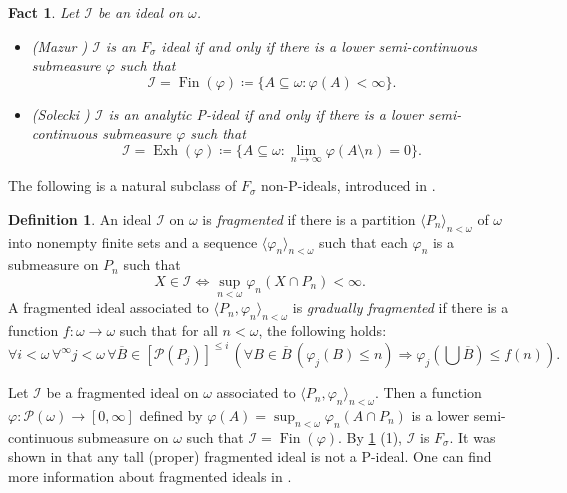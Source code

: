 \documentclass[a4paper,12pt]{amsart}
\newtheorem{fac}[thm]{Fact}
\theoremstyle{definition}
\newtheorem{dfn}[thm]{Definition}
\numberwithin{thm}{section}
\numberwithin{equation}{section}
\newcommand{\I}{\mathscr{I}}
\DeclareMathOperator{\Exh}{Exh}
\DeclareMathOperator{\Fin}{Fin}
\begin{document}
    \begin{fac}\label{fac:submeasure_chara}
        Let $\I$ be an ideal on $\omega$.
        \begin{itemize}
            \item \textnormal{(Mazur \cite{Maz91})} $\I$ is an $F_\sigma$ ideal if and only if there is a lower semi-continuous submeasure $\varphi$ such that
            \[
            \I=\Fin(\varphi)\coloneqq\{A\subseteq\omega:\varphi(A)<\infty\}.
            \]
            \item \textnormal{(Solecki \cite{Sol99})} $\I$ is an analytic P-ideal if and only if there is a lower semi-continuous submeasure $\varphi$ such that
            \[
            \I=\Exh(\varphi)\coloneqq\{A\subseteq\omega:\lim_{n\to\infty}\varphi(A\setminus n)=0\}.
            \]
        \end{itemize}
    \end{fac}
    
    The following is a natural subclass of $F_\sigma$ non-P-ideals, introduced in \cite{HRRZ14}.
    
    \begin{dfn}
        An ideal $\I$ on $\omega$ is \emph{fragmented} if there is a partition $\langle P_n\rangle_{n<\omega}$ of $\omega$ into nonempty finite sets and a sequence $\langle\varphi_n\rangle_{n<\omega}$ such that each $\varphi_n$ is a submeasure on $P_n$ such that
        \[
        X\in\I \iff \sup_{n<\omega}\varphi_n(X\cap P_n) < \infty.
        \]
        A fragmented ideal associated to $\langle P_n, \varphi_n\rangle_{n<\omega}$ is \emph{gradually fragmented} if there is a function $f\colon\omega\to\omega$ such that for all $n<\omega$, the following holds:
        \[
        \forall i<\omega\,\forall^{\infty} j<\omega\,\forall \overline{B}\in[\mathcal{P}(P_j)]^{\leq i}\,\left(\forall B\in\overline{B}\,(\varphi_j(B)\leq n)\Rightarrow\varphi_j\left(\bigcup\overline{B}\right)\leq f(n)\right).
        \]
    \end{dfn}

    Let $\I$ be a fragmented ideal on $\omega$ associated to $\langle P_n, \varphi_n\rangle_{n<\omega}$. Then a function $\varphi\colon\mathcal{P}(\omega)\to[0, \infty]$ defined by $\varphi(A) = \sup_{n<\omega}\varphi_n(A\cap P_n)$ is a lower semi-continuous submeasure on $\omega$ such that $\I = \Fin(\varphi)$. By \cref{fac:submeasure_chara} (1), $\I$ is $F_\sigma$. It was shown in \cite[Corollary 2.9]{BM14} that any tall (proper) fragmented ideal is not a P-ideal. One can find more information about fragmented ideals in \cite{BM14}.
\end{document}
